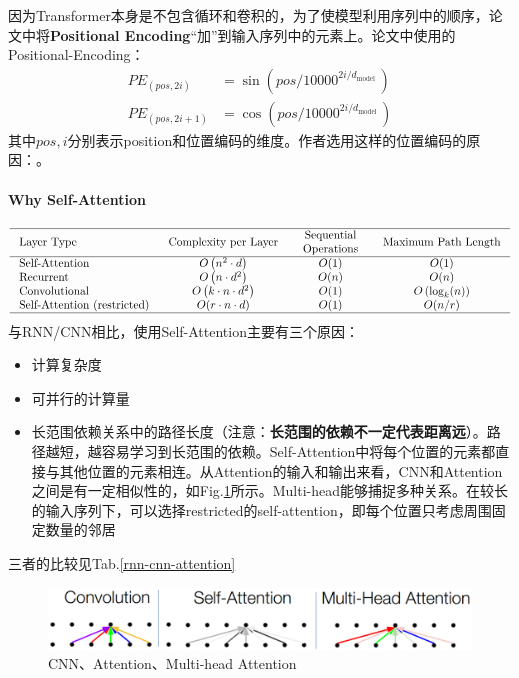 因为Transformer本身是不包含循环和卷积的，为了使模型利用序列中的顺序，论文中将\textbf{Positional Encoding}“加”到输入序列中的元素上。论文中使用的Positional-Encoding：
$$
\begin{aligned}
	P E_{(p o s, 2 i)} &=\sin \left(p o s / 10000^{2 i / d_{\text {model }}}\right) \\
	P E_{(p o s, 2 i+1)} &=\cos \left(p o s / 10000^{2 i / d_{\text {model }}}\right)
\end{aligned}
$$
其中$pos,i$分别表示position和位置编码的维度。作者选用这样的位置编码的原因：。

\paragraph{Why Self-Attention}
$$
\begin{array}{lccc}
	\hline \text { Layer Type } & \text { Complexity per Layer } & \begin{array}{c}
		\text { Sequential } \\
		\text { Operations }
	\end{array} & \text { Maximum Path Length } \\
	\hline \text { Self-Attention } & O\left(n^{2} \cdot d\right) & O(1) & O(1) \\
	\text { Recurrent } & O\left(n \cdot d^{2}\right) & O(n) & O(n) \\
	\text { Convolutional } & O\left(k \cdot n \cdot d^{2}\right) & O(1) & O\left(\log _{k}(n)\right) \\
	\text { Self-Attention (restricted) } & O(r \cdot n \cdot d) & O(1) & O(n / r) \\
	\hline
	\label{rnn-cnn-attention}
\end{array}
$$
与RNN/CNN相比，使用Self-Attention主要有三个原因：
\begin{itemize}
	\item 计算复杂度
	\item 可并行的计算量
	\item 长范围依赖关系中的路径长度（注意：\textbf{长范围的依赖不一定代表距离远}）。路径越短，越容易学习到长范围的依赖。Self-Attention中将每个位置的元素都直接与其他位置的元素相连。从Attention的输入和输出来看，CNN和Attention之间是有一定相似性的，如Fig.\ref{fig:cnn-attention-multi head}所示。Multi-head能够捕捉多种关系。在较长的输入序列下，可以选择restricted的self-attention，即每个位置只考虑周围固定数量的邻居
\end{itemize}
三者的比较见Tab.\ref{rnn-cnn-attention}
\begin{figure}[h]
	\centering
	\includegraphics[width=.8\textwidth]{pics/CNN-Attention-Multi head.png}
	\caption{CNN、Attention、Multi-head Attention}
	\label{fig:cnn-attention-multi head}
\end{figure}

